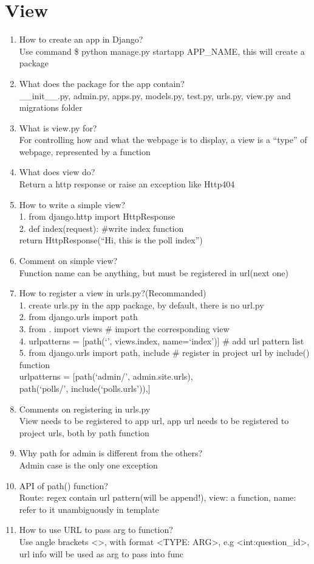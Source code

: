 \documentclass[10pt,a4paper,oneside]{article}
\begin{document}
\section{View}
\begin{enumerate}[1.]
\item How to create an app in Django?\\
Use command \$ python manage.py startapp APP\_NAME, this will create a package
\item What does the package for the app contain?\\
\_\_init\_\_.py, admin.py, apps.py, models.py, test.py, urls.py, view.py and migrations folder
\item What is view.py for?\\
For controlling how and what the webpage is to display, a view is a ``type'' of webpage, represented by a function
\item What does view do?\\
Return a http response or raise an exception like Http404
\item How to write a simple view?\\
1. from django.http import HttpResponse\\
2. def index(request): \#write index function\\
\indent\quad \quad \quad return HttpResponse(``Hi, this is the poll index'')
\item Comment on simple view?\\
Function name can be anything, but must be registered in url(next one)
\item How to register a view in urls.py?(Recommanded)\\
1. create urls.py in the app package, by default, there is no url.py \\
2. from django.urls import path\\
3. from . import views \# import the corresponding view\\
4. urlpatterns = [path(`', views.index, name=`index')] \# add url pattern list\\
5. from django.urls import path, include \# register in project url by include() \indent\quad  function \\
\indent\quad urlpatterns = [path(`admin/', admin.site.urls),\\
\indent\quad path(`polls/', include(`polls.urls')),]
\item Comments on registering in urls.py\\
View needs to be registered to app url, app url needs to be registered to project urls, both by path function
\item Why path for admin is different from the others?\\
Admin case is the only one exception
\item API of path() function?\\
Route: regex contain url pattern(will be append!), view: a function, name: refer to it unambiguously in template
\item How to use URL to pass arg to function?\\
Use angle brackets <>, with format <TYPE: ARG>, e.g <int:question\_id>, url info will be used as arg to pass into func
\end{enumerate}
\end{document}

